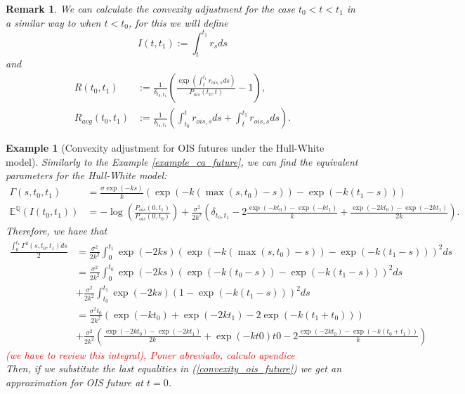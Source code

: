 \documentclass[a4paper,10pt]{article}
\newtheorem{example}[theorem]{Example}
\newtheorem{remark}[theorem]{Remark}
\newcommand{\1}{\mathbf{1}}
\begin{document}
\begin{remark}
We can calculate the convexity adjustment for the case $t_0 < t < t_1$ in a similar way to when $t < t_0$, for this we will define
\begin{equation*}
I(t,t_1):=\int_{t}^{t_1} r_s ds
\end{equation*}
and 
\begin{align*}
R(t_0,t_1) &:= \frac{1}{\delta_{t_0,t_1}}\left(\frac{\exp(\int_{t}^{t_1} r_{ois,s} ds )}{P_{ois}(t_0,t)} - 1\right), \\
R_{avg}(t_0,t_1) &:= \frac{1}{\delta_{t_0,t_1}}\left(\int_{t_0}^{t} r_{ois,s} ds + \int_{t}^{t_1} r_{ois,s} ds\right).   
\end{align*}
\end{remark}

\begin{example}[Convexity adjustment for OIS futures under the Hull-White model]\label{example_convexity_hw_ois}
Similarly to the Example \ref{example_ca_future}, we can find the equivalent parameters for the Hull-White model: 
\begin{align*}
\Gamma(s,t_0,t_1) &= \frac{\sigma \exp(-ks)}{k}\left(\exp(-k(\max(s,t_0) - s)) - \exp(-k(t_1-s))\right)\\
\mathbb{E}^{\mathbb{Q}}\left(I(t_0,t_1)\right)&=-\log\left(\frac{P_{ois}(0,t_1)}{P_{ois}(0,t_0)}\right) + \frac{\sigma^{2}}{2k^{2}}\left(\delta_{t_0,t_1} - 2 \frac{\exp(-kt_0) - \exp(-kt_1)}{k} + \frac{\exp(-2kt_0) - \exp(-2kt_1)}{2k}  \right).
\end{align*}
Therefore, we have that
\begin{align*}
\frac{\int_{0}^{t_1} \Gamma^{2}(s,t_0,t_1) ds}{2} &= \frac{\sigma^{2}}{2k^2} \int_{0}^{t_1}  \exp(-2ks)\left(\exp(-k(\max(s,t_0) - s)) - \exp(-k(t_1 - s))\right)^{2} ds \\
&= \frac{\sigma^{2}}{2k^2} \int_{0}^{t_0} \exp(-2ks)\left(\exp(-k(t_0 - s)) - \exp(-k(t_1 - s))\right)^{2} ds\\
&+ \frac{\sigma^{2}}{2k^2} \int_{t_0}^{t_1} \exp(-2ks)\left(1 - \exp(-k(t_1 - s))\right)^{2} ds\\
&= \frac{\sigma^{2}t_0}{2k^{2}} \left( \exp(-kt_0) + \exp(-2kt_1) - 2 \exp(-k(t_1+t_0)) \right)\\  
&+ \frac{\sigma^{2}}{2k^{2}} \left(\frac{\exp(-2kt_0) - \exp(-2kt_1)}{2k}  + \exp(-kt0)t0 - 2 \frac{\exp(-2kt_0) - \exp(-k(t_0 + t_1))}{k}  \right)
\end{align*} \textcolor{red}{(we have to review this integral), Poner abreviado, calculo apendice}\\
Then, if we substitute the last equalities in (\ref{convexity_ois_future}) we get an approximation for OIS future at $t=0$.\\


\end{example}
\end{document}
